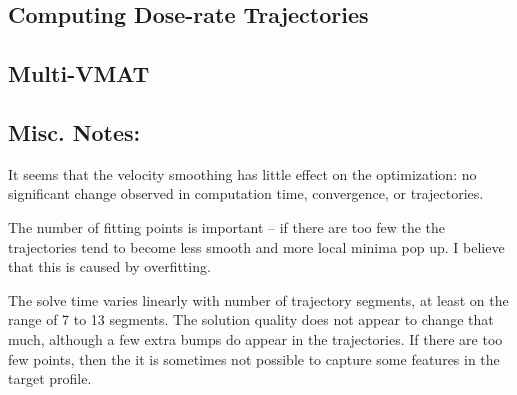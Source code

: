 \subsection{Computing Dose-rate Trajectories}


\subsection{Multi-VMAT}


\subsection{Misc. Notes:}


It seems that the velocity smoothing has little effect on the optimization: no significant
change observed in computation time, convergence, or trajectories.

The number of fitting points is important -- if there are too few the the trajectories tend to
become less smooth and more local minima pop up. I believe that this is caused by overfitting.

The solve time varies linearly with number of trajectory segments, at least on the range of 7 to 13 segments.
The solution quality does not appear to change that much, although a few extra bumps do appear in the trajectories.
If there are too few points, then the it is sometimes not possible to capture some features in the target profile.
